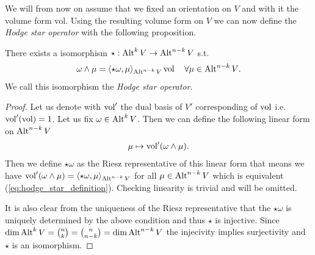 \documentclass[../main.tex]{subfiles}
\begin{document}
We will from now on assume that we fixed an orientation on $V$ and with it 
the volume form vol. 
Using the resulting volume form on $V$
we can now define the \textit{Hodge star operator} with the following 
proposition.
\begin{proposition}
    There exists a isomorphism $\star: {\text{Alt}^{k}\,V} 
    \rightarrow {\text{Alt}^{n-k}\,V}$ s.t. 
    \begin{align}
        \omega \wedge \mu = \langle \star \omega, \mu \rangle_{{\text{Alt}^{n-k}\,V}}
        \operatorname{vol} \quad \forall \mu \in {\text{Alt}^{n-k}\,V}.
        \label{eq:hodge_star_definition}            
    \end{align}
    We call this isomorphism the \textit{Hodge star operator}.
\end{proposition}
\begin{proof}
    Let us denote with $\operatorname{vol}'$ the dual basis of $V'$ corresponding of $\operatorname{vol}$ i.e.
    $\operatorname{vol}'(\operatorname{vol}) = 1$. Let us fix $\omega \in {\text{Alt}^{k}\,V}$. 
    Then we can define the following linear form on $
    {\text{Alt}^{n-k}\,V}$
    \begin{align*}
        \mu \mapsto \operatorname{vol}' (\omega \wedge \mu).
    \end{align*}
    Then we define
    $\star \omega$ as the Riesz representative of this linear form that means we 
    have $\operatorname{vol}'(\omega \wedge \mu) = 
    \langle \star \omega, \mu \rangle_{{\text{Alt}^{n-k}\,V}}$ for all 
    $\mu \in {\text{Alt}^{n-k}\,V}$ which is equivalent (\ref{eq:hodge_star_definition}).
    Checking linearity is trivial and will be omitted.

    It is also clear from the uniqueness of the Riesz representative that 
    the $\star\omega$ is uniquely determined by the above condition and 
    thus $\star$ is injective. Since $\dim {\text{Alt}^{k}\,V} = 
    \binom{n}{k} = \binom{n}{n-k} = \dim {\text{Alt}^{n-k}\,V}$ the injecivity 
    implies surjectivity and $\star$ is an isomorphism.
\end{proof}
\end{document}
